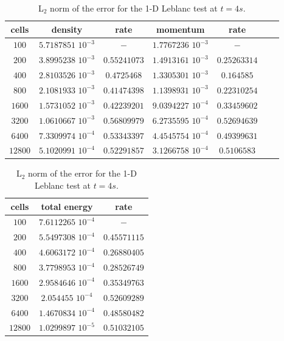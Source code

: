%
\begin{table}[H]
\begin{center}
 \caption{\label{tbl:l2_norm_leblanc} L$_2$ norm of the error for the 1-D Leblanc test at $t=4s$.}
 \begin{tabular}{|c|c|c|c|c|c|c|}
 \hline
   cells & density & rate & momentum & rate \\ \hline
$100$ &   $5.7187851$ $10^{-3}$ & $-$ & $1.7767236$ $10^{-3}$ & $-$ \\ \hline
$200$  &  $3.8995238$ $10^{-3}$ & $0.55241073$ & $1.4913161$ $10^{-3}$ & $0.25263314$ \\ \hline
$400$ & $2.8103526$ $10^{-3}$   & $0.4725468$ & $1.3305301$ $10^{-3}$ & $0.164585$ \\ \hline
$800$ & $2.1081933$ $10^{-3}$   & $0.41474398$ & $1.1398931$ $10^{-3}$ & $0.22310254$ \\ \hline
$1600$ & $1.5731052$ $10^{-3}$  & $0.42239201$ & $9.0394227$ $10^{-4}$ & $0.33459602$ \\ \hline
$3200$&$1.0610667$ $10^{-3}$    & $0.56809979$ & $6.2735595$ $10^{-4}$ & $0.52694639$ \\ \hline
$6400$&$7.3309974$ $10^{-4}$    & $0.53343397$ & $4.4545754$ $10^{-4}$ & $0.49399631$ \\ \hline
 $12800$&$5.1020991$ $10^{-4}$  & $0.52291857$ & $3.1266758$ $10^{-4}$ & $0.5106583$ \\ \hline
\end{tabular}
\begin{tabular}{|c|c|c|}
\hline
cells & total energy & rate \\ \hline
$100$ & $7.6112265$  $10^{-4}$& $-$\\   \hline
$200$ & $5.5497308$ $10^{-4}$& $0.45571115$\\ \hline
$400$ & $4.6063172$ $10^{-4}$ & $0.26880405$\\ \hline
$800$ & $3.7798953$ $10^{-4}$ & $0.28526749$\\ \hline
$1600$ & $2.9584646$ $10^{-4}$ & $0.35349763$\\ \hline
$3200$ & $2.054455$ $10^{-4}$ & $0.52609289$\\ \hline
$6400$ & $1.4670834$ $10^{-4}$ & $0.48580482$\\ \hline
$12800$ & $1.0299897$ $10^{-5}$ & $0.51032105$\\  \hline
\end{tabular}
\end{center}
\end{table}

